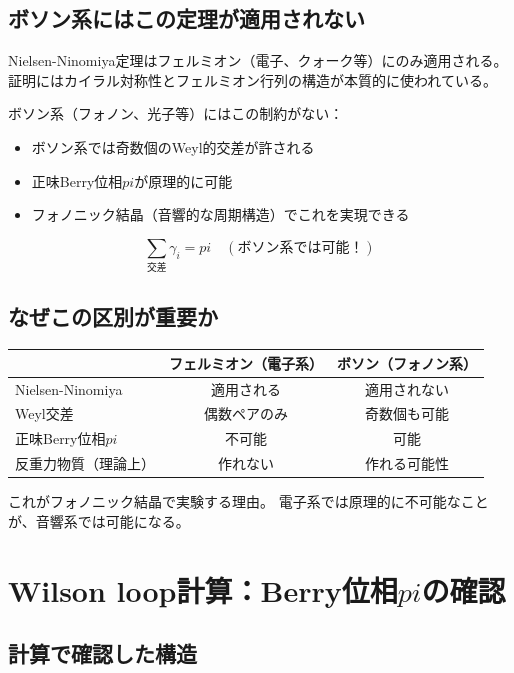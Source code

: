 \documentclass[11pt,a4paper]{article}
\def\pi{pi}%
\def\textbf#1{#1}%
\begin{document}
\subsection{ボソン系にはこの定理が適用されない}

Nielsen-Ninomiya定理は\textbf{フェルミオン}（電子、クォーク等）にのみ適用される。
証明にはカイラル対称性とフェルミオン行列の構造が本質的に使われている。

\textbf{ボソン系}（フォノン、光子等）にはこの制約がない：
\begin{itemize}
\item ボソン系では奇数個のWeyl的交差が許される
\item 正味Berry位相$\pi$が原理的に可能
\item フォノニック結晶（音響的な周期構造）でこれを実現できる
\end{itemize}

\begin{equation}
  \sum_{\text{交差}} \gamma_i = \pi \quad (\text{ボソン系では可能！})
\end{equation}

\subsection{なぜこの区別が重要か}

\begin{center}
\begin{tabular}{lcc}
\toprule
& フェルミオン（電子系） & ボソン（フォノン系） \\
\midrule
Nielsen-Ninomiya & 適用される & \textbf{適用されない} \\
Weyl交差 & 偶数ペアのみ & 奇数個も可能 \\
正味Berry位相$\pi$ & 不可能 & \textbf{可能} \\
反重力物質（理論上） & 作れない & \textbf{作れる可能性} \\
\bottomrule
\end{tabular}
\end{center}

これがフォノニック結晶で実験する理由。
電子系では原理的に不可能なことが、音響系では可能になる。


\section{Wilson loop計算：Berry位相$\pi$の確認}

\subsection{計算で確認した構造}
\end{document}
